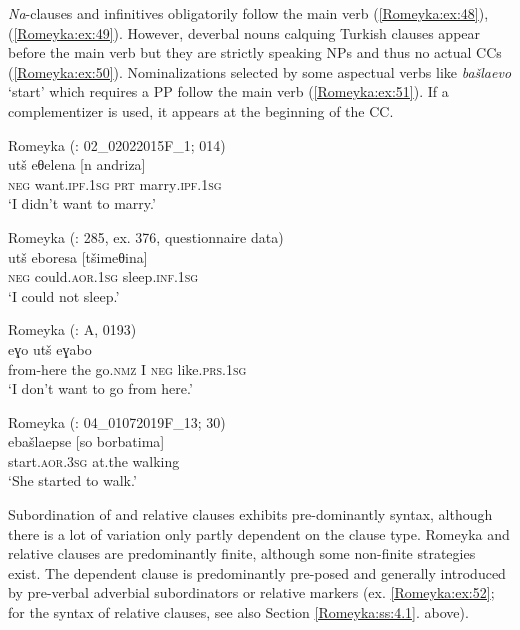 \documentclass[output=paper,colorlinks,citecolor=brown]{langscibook}
\begin{document}
\textit{Na}-clauses and infinitives obligatorily follow the main verb (\ref{Romeyka:ex:48}), (\ref{Romeyka:ex:49}). However, deverbal nouns calquing Turkish  clauses appear before the main verb but they are strictly speaking NPs and thus no actual CCs (\ref{Romeyka:ex:50}). Nominalizations selected by some aspectual verbs like \textit{bašlaevo} `start' which requires a PP follow the main verb (\ref{Romeyka:ex:51}). If a complementizer is used, it appears at the beginning of the CC.

\ea\label{Romeyka:ex:48} 	
Romeyka (\citealt{schreiber_inprep}: 02\_02022015F\_1; 014) \\
\gll utš eθelena [n andriza] \\
\textsc{neg} want\textsc{.ipf.1sg} \textsc{prt} marry\textsc{.ipf.1sg} \\
\glt `I didn't want to marry.'
\z

\ea\label{Romeyka:ex:49} 
Romeyka (\citealt{schreibergrammar2022}: 285, ex. 376, questionnaire data) \\
\gll utš eboresa [tšimeθina] \\
\textsc{neg} could\textsc{.aor.1sg} sleep\textsc{.inf.1sg} \\
\glt `I could not sleep.'
\z

\ea\label{Romeyka:ex:50}
Romeyka (\citealt{schreiber2021pontic}: A, 0193) \\
 eɣo utš eɣabo \\
from-here the go\textsc{.nmz} I \textsc{neg} like\textsc{.prs.1sg} \\
\glt `I don't want to go from here.'  \\
\z

\ea\label{Romeyka:ex:51}
Romeyka (\citealt{schreiber_inprep}: 04\_01072019F\_13; 30) \\
\gll ebašlaepse [so borbatima] \\
start\textsc{.aor.3sg} at.the walking \\
\glt  `She started to walk.'
\z

Subordination of  and relative clauses exhibits pre-dominantly  syntax, although there is a lot of variation only partly dependent on the clause type. Romeyka  and relative clauses are predominantly finite, although some non-finite strategies exist. The dependent clause is predominantly pre-posed and generally introduced by pre-verbal adverbial subordinators or relative markers (ex. \ref{Romeyka:ex:52}; for the syntax of relative clauses, see also Section \ref{Romeyka:ss:4.1}. above).
\end{document}
